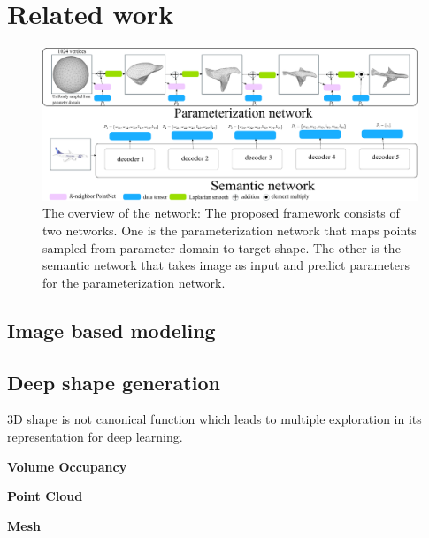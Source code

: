 \section{Related work}
\begin{figure}[htbp]
	\centering
	\includegraphics[width=\linewidth]{img/net/overview}
	\caption{The overview of the network: The proposed framework consists of two networks. One is the parameterization network that maps points sampled from parameter domain to target shape. The other is the semantic network that takes image as input and predict parameters for the parameterization network.}
	\label{fig:overview}
\end{figure}
\subsection{Image based modeling}
\subsection{Deep shape generation}
3D shape is not canonical function which leads to multiple exploration in its representation for deep learning.

\noindent\textbf{Volume Occupancy}

\noindent\textbf{Point Cloud}

\noindent\textbf{Mesh}
